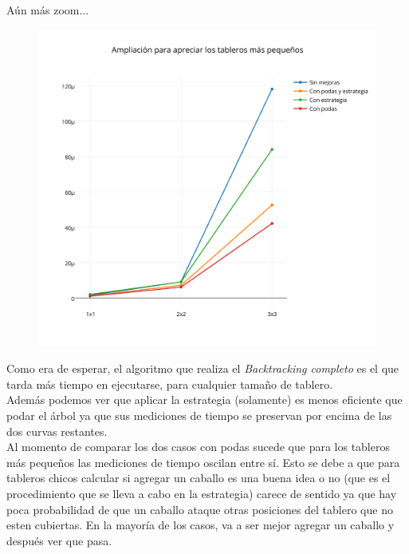 A\'un m\'as zoom...

 \begin{figure}[h!]
   \begin{center}
   \includegraphics[scale=0.18]{../src/ej3/Mediciones/vacios/promedios3.png}
   \end{center}
 \end{figure}
\newpage

Como era de esperar, el algoritmo que realiza el \emph{Backtracking completo} es el que tarda más tiempo en ejecutarse, para cualquier tamaño de tablero.\\

Adem\'as podemos ver que aplicar la estrategia (solamente) es menos eficiente que podar el árbol ya que sus mediciones de tiempo se preservan por encima de las dos curvas restantes.\\

Al momento de comparar los dos casos con podas sucede que para los tableros más pequeños las mediciones de tiempo oscilan entre sí. Esto se debe a que para tableros chicos calcular si agregar un caballo es una buena idea o no (que es el procedimiento que se lleva a cabo en la estrategia) carece de sentido ya que hay poca probabilidad de que un caballo ataque otras posiciones del tablero que no esten cubiertas. En la mayoría de los casos, va a ser mejor agregar un caballo y después ver que pasa.

